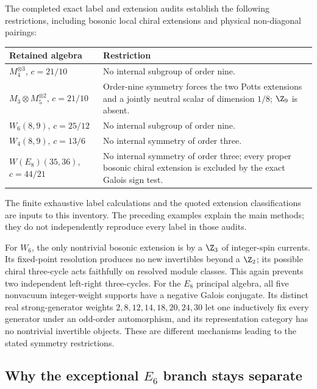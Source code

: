 \begin{constructioninput}
The completed exact label and extension audits establish the
following restrictions, including bosonic local chiral extensions
and physical non-diagonal pairings:
\begin{center}
\begin{tabular}{p{}p{}}
Retained algebra & Restriction\\\hline
$M_4^{\otimes3}$, $c=21/10$
 & No internal subgroup of order nine.\\[3pt]
$M_3\otimes M_5^{\otimes2}$, $c=21/10$
 & Order-nine symmetry forces the two Potts extensions and a
 jointly neutral scalar of dimension $1/8$; $\Z_9$ is absent.\\[3pt]
$W_6(8,9)$, $c=25/12$
 & No internal subgroup of order nine.\\[3pt]
$W_4(8,9)$, $c=13/6$
 & No internal symmetry of order three.\\[3pt]
$W(E_8)(35,36)$, $c=44/21$
 & No internal symmetry of order three; every proper bosonic
 chiral extension is excluded by the exact Galois sign test.
\end{tabular}
\end{center}
The finite exhaustive label calculations and the quoted extension
classifications are inputs to this inventory. The preceding
examples explain the main methods; they do not independently
reproduce every label in those audits.
\end{constructioninput}

For $W_6$, the only nontrivial bosonic extension is by a $\Z_3$ of
integer-spin currents. Its fixed-point resolution produces no
new invertibles beyond a $\Z_2$; its possible chiral
three-cycle acts faithfully on resolved module classes. This
again prevents two independent left-right three-cycles. For the
$E_8$ principal algebra, all five nonvacuum integer-weight
supports have a negative Galois conjugate. Its distinct real
strong-generator weights $2,8,12,14,18,20,24,30$ let one
inductively fix every generator under an odd-order automorphism,
and its representation category has no nontrivial invertible
objects. These are different mechanisms leading to the stated
symmetry restrictions.

\subsection{Why the exceptional \texorpdfstring{$E_6$}{E6} branch stays separate}

